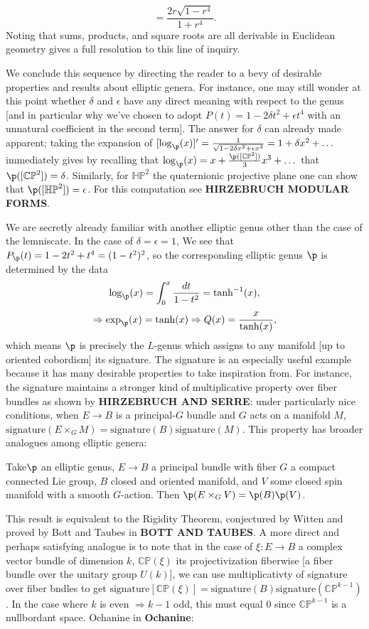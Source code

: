 \[ =\frac{2r \sqrt{1 - r^4} }{1 + r^4}.\]
Noting that sums, products, and square roots are all derivable in Euclidean geometry gives a full resolution to this line of inquiry. 

We conclude this sequence by directing the reader to a bevy of desirable properties and results about elliptic genera. For instance, one may still wonder at this point whether $\delta$ and $\epsilon$ have any direct meaning with respect to the genus [and in particular why we've chosen to adopt $P(t) = 1 - 2 \delta t^2 + \epsilon t^4$ with an unnatural coefficient in the second term]. The answer for $\delta$ can already made apparent; taking the expansion of $[\log_{\p} (x)]' = \frac{1}{\sqrt{1 - 2 \delta x^2 + \epsilon x^4}} = 1 + \delta x^2 + \dots$ immediately gives by recalling that $\log_\p (x) = x + \frac{\p([\mathbb{CP}^2])}{3} x^3 + \dots $ that $\p ([\mathbb{CP}^2]) = \delta$. Similarly, for $\mathbb{HP}^2$ the quaternionic projective plane one can show that $\p([\mathbb{HP}^2]) = \epsilon$. For this computation see \textbf{HIRZEBRUCH MODULAR FORMS}. 
  
We are secretly already familiar with another elliptic genus other than the case of the lemniscate. In the case of $\delta = \epsilon = 1$, We see that $P_\p(t) = 1 - 2 t^2 + t^4 = (1 - t^2)^2$, so the corresponding elliptic genus $\p$ is determined by the data
\[\log_{\p}(x) = \int_0^x \frac{dt}{1 - t^2} = \tanh^{-1}(x),\]
\[ \Rightarrow \exp_\p (x) = \tanh(x) \Rightarrow Q(x) = \frac{x}{\tanh(x)},\]
which means $\p$ is precisely the $L$-genus which assigns to any manifold [up to oriented cobordism] its signature. The signature is an especially useful example because it has many desirable properties to take inspiration from. For instance, the signature maintains a stronger kind of multiplicative property over fiber bundles as shown by \textbf{HIRZEBRUCH AND SERRE}: under particularly nice conditions, when $E \to B$ is a principal-$G$ bundle and $G$ acts on a manifold $M$, $\text{signature}(E \times_G M) = \text{signature}(B) \text{signature}(M) $. This property has broader analogues among elliptic genera:

\begin{theorem}
    Take$\p$ an elliptic genus, $E \to B$ a principal bundle with fiber $G$ a compact connected Lie group, $B$ closed and oriented manifold, and $V$ some closed spin manifold with a smooth $G$-action. Then $\p(E \times_G V) = \p(B) \p(V)$. 
\end{theorem}
This result is equivalent to the Rigidity Theorem, conjectured by Witten and proved by Bott and Taubes in \textbf{BOTT AND TAUBES}. A more direct and perhaps satisfying analogue is to note that in the case of $\xi: E \to B$ a complex vector bundle of dimension $k$, $\mathbb{CP}(\xi)$ its projectivization fiberwise [a fiber bundle over the unitary group $U(k)$], we can use multiplicativty of signature over fiber bndles to get $\text{signature} [\mathbb{CP}(\xi)] = \text{signature}(B) \text{signature}(\mathbb{CP}^{k-1})$. In the case where $k$ is even $\Rightarrow k - 1$ odd, this must equal $0$ since $\mathbb{CP}^{k-1}$ is a nullbordant space. Ochanine in \textbf{Ochanine}:

